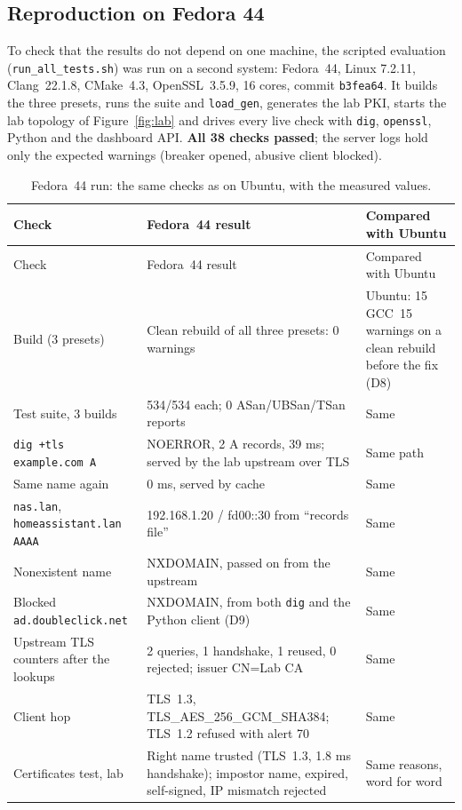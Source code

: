 \documentclass[11pt,a4paper]{article}
\newcommand{\code}[1]{\texttt{#1}}
\begin{document}
\subsection{Reproduction on Fedora 44}\label{sec:fedora}
To check that the results do not depend on one machine, the scripted evaluation (\code{run\_all\_tests.sh})
was run on a second system: Fedora~44, Linux 7.2.11, Clang~22.1.8, CMake~4.3, OpenSSL~3.5.9, 16 cores, commit
\code{b3fea64}. It builds the three presets, runs the suite and \code{load\_gen}, generates the lab PKI, starts
the lab topology of Figure~\ref{fig:lab} and drives every live check with \code{dig}, \code{openssl},
Python and the dashboard API. \textbf{All 38 checks passed}; the server logs hold only the expected
warnings (breaker opened, abusive client blocked).

{\small
\begin{longtable}{@{}P{4.6cm}P{5.6cm}P{5.0cm}@{}}
\caption{Fedora~44 run: the same checks as on Ubuntu, with the measured values.}\label{tab:fedora}\\
\toprule
Check & Fedora~44 result & Compared with Ubuntu \\
\midrule
\endfirsthead
\toprule
Check & Fedora~44 result & Compared with Ubuntu \\
\midrule
\endhead
Build (3 presets) & Clean rebuild of all three presets: 0 warnings & Ubuntu: 15 GCC~15 warnings on a clean rebuild before the fix (D8) \\
Test suite, 3 builds & 534/534 each; 0 ASan/UBSan/TSan reports & Same \\
\code{dig +tls example.com A} & NOERROR, 2 A records, 39 ms; served by the lab upstream over TLS & Same path \\
Same name again & 0 ms, served by cache & Same \\
\code{nas.lan}, \code{homeassistant.lan AAAA} & 192.168.1.20 / fd00::30 from ``records file'' & Same \\
Nonexistent name & NXDOMAIN, passed on from the upstream & Same \\
Blocked \code{ad.doubleclick.net} & NXDOMAIN, from both \code{dig} and the Python client (D9) & Same \\
Upstream TLS counters after the lookups & 2 queries, 1 handshake, 1 reused, 0 rejected; issuer CN=Lab CA & Same \\
Client hop & TLS~1.3, TLS\_AES\_256\_GCM\_SHA384; TLS~1.2 refused with alert 70 & Same \\
Certificates test, lab & Right name trusted (TLS~1.3, 1.8 ms handshake); impostor name, expired, self-signed, IP mismatch rejected & Same reasons, word for word \\

\end{longtable}}
\end{document}
